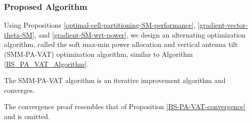 \subsubsection{Proposed Algorithm}\label{SM-Algorithm}
Using Propositions \ref{optimal-cell-partitioning-SM-performance}, \ref{gradient-vector-theta-SM}, and \ref{gradient-SM-wrt-power}, we design an alternating optimization algorithm, called the soft max-min power allocation and vertical antenna tilt (SMM-PA-VAT) optimization algorithm, similar to Algorithm \ref{BS_PA_VAT_Algorithm}.


\begin{Proposition}\label{SMM-PA-VAT-convergence}
    The SMM-PA-VAT algorithm is an iterative improvement algorithm and converges.
\end{Proposition}
The convergence proof resembles that of Proposition \ref{BS-PA-VAT-convergence} and  is omitted. 